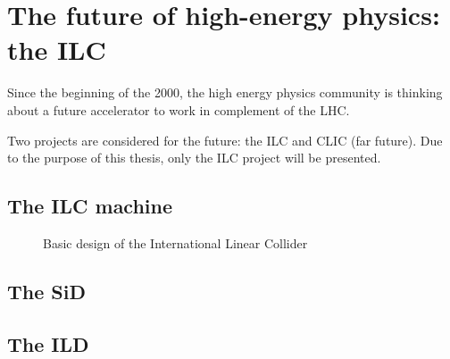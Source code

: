 \chapter{The future of high-energy physics: the ILC}

  Since the beginning of the 2000, the high energy physics community is thinking about a future accelerator to work in complement of the LHC.


  Two projects are considered for the future: the ILC and CLIC (far future).
  Due to the purpose of this thesis, only the ILC project will be presented. 
  
  
  
   
  \section{The ILC machine}

  \begin{figure}
    \centering
    \caption{Basic design of the International Linear Collider}
    \label{fig:ILC}
  \end{figure}
  \section{The SiD}

  \section{The ILD}
